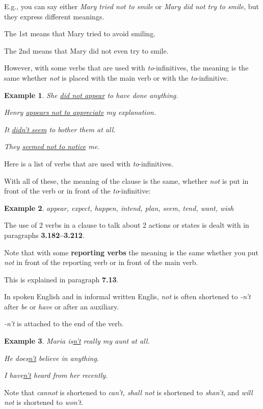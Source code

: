 \documentclass[oneside]{book}
\numberwithin{equation}{section}
\newtheorem{example}{Example}[section]
\begin{document}
%
E.g., you can say either \textit{Mary tried not to smile} or \textit{Mary did not try to smile}, but they express different meanings.

The 1st means that Mary tried to avoid smiling.

The 2nd means that Mary did not even try to smile.

%
However, with some verbs that are used with \textit{to}-infinitives, the meaning is the same whether \textit{not} is placed with the main verb or with the \textit{to}-infinitive.
\begin{example}
    She \underline{did not appear} to have done anything.
    
    Henry \underline{appears not to appreciate} my explanation.
    
    It \underline{didn't seem} to bother them at all.
    
    They \underline{seemed not to notice} me.
\end{example}
Here is a list of verbs that are used with \textit{to}-infinitives.

With all of these, the meaning of the clause is the same, whether \textit{not} is put in front of the verb or in front of the \textit{to}-infinitive:
\begin{example}
    appear, expect, happen, intend, plan, seem, tend, want, wish
\end{example}
The use of 2 verbs in a clause to talk about 2 actions or states is dealt with in paragraphs \textbf{3.182--3.212}.

%
Note that with some \textbf{reporting verbs} the meaning is the same whether you put \textit{not} in front of the reporting verb or in front of the main verb.

This is explained in paragraph \textbf{7.13}.

%
\noindent{} In spoken English and in informal written Englis, \textit{not} is often shortened to \textit{-n't} after \textit{be} or \textit{have} or after an auxiliary.

\textit{-n't} is attached to the end of the verb.
\begin{example}
    Maria is\underline{n't} really my aunt at all.
    
    He does\underline{n't} believe in anything.
    
    I have\underline{n't} heard from her recently.
\end{example}
Note that \textit{cannot} is shortened to \textit{can't, shall not} is shortened to \textit{shan't}, and \textit{will not} is shortened to \textit{won't}.
\end{document}

